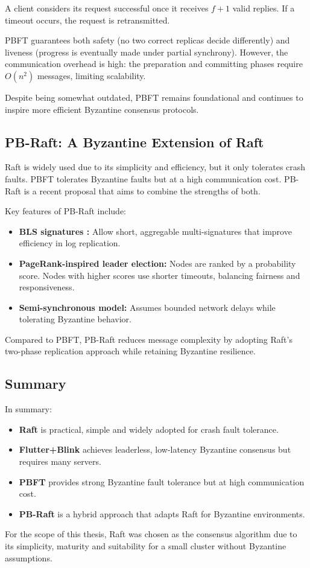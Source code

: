 A client considers its request successful once it receives $f+1$ valid replies. If a timeout occurs, the request is retransmitted.  

PBFT guarantees both safety (no two correct replicas decide differently) and liveness (progress is eventually made under partial synchrony). However, the communication overhead is high: the preparation and committing phases require $O(n^2)$ messages, limiting scalability.  

Despite being somewhat outdated, PBFT remains foundational and continues to inspire more efficient Byzantine consensus protocols.

\subsection{PB-Raft: A Byzantine Extension of Raft}

Raft is widely used due to its simplicity and efficiency, but it only tolerates crash faults. PBFT tolerates Byzantine faults but at a high communication cost.  
PB-Raft \cite{shi2025pb} is a recent proposal that aims to combine the strengths of both.

Key features of PB-Raft include:
\begin{itemize}
    \item \textbf{BLS signatures \cite{boneh2001short}:} Allow short, aggregable multi-signatures that improve efficiency in log replication.
    \item \textbf{PageRank-inspired leader election:} Nodes are ranked by a probability score. Nodes with higher scores use shorter timeouts, balancing fairness and responsiveness.
    \item \textbf{Semi-synchronous model:} Assumes bounded network delays while tolerating Byzantine behavior.
\end{itemize}

Compared to PBFT, PB-Raft reduces message complexity by adopting Raft's two-phase replication approach while retaining Byzantine resilience.  

\subsection{Summary}

In summary:
\begin{itemize}
    \item \textbf{Raft} is practical, simple and widely adopted for crash fault tolerance.
    \item \textbf{Flutter+Blink} achieves leaderless, low-latency Byzantine consensus but requires many servers.
    \item \textbf{PBFT} provides strong Byzantine fault tolerance but at high communication cost.
    \item \textbf{PB-Raft} is a hybrid approach that adapts Raft for Byzantine environments.
\end{itemize}

For the scope of this thesis, Raft was chosen as the consensus algorithm due to its simplicity, maturity and suitability for a small cluster without Byzantine assumptions.
